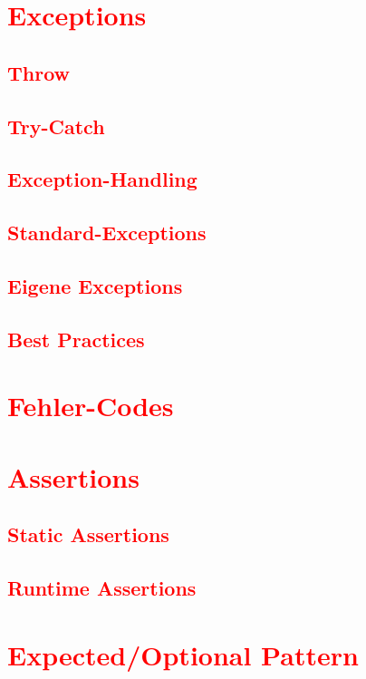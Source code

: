 \section{\textcolor{red}{Exceptions}}\label{sec:exceptions}
\subsection{\textcolor{red}{Throw}}\label{sec:throw}
\subsection{\textcolor{red}{Try-Catch}}\label{sec:catch}
\subsection{\textcolor{red}{Exception-Handling}}\label{sec:exception-handling}
\subsection{\textcolor{red}{Standard-Exceptions}}\label{sec:standard-exceptions}
\subsection{\textcolor{red}{Eigene Exceptions}}\label{sec:custom-exceptions}
\subsection{\textcolor{red}{Best Practices}}\label{sec:best-practices}
\section{\textcolor{red}{Fehler-Codes}}\label{sec:error-codes}
\section{\textcolor{red}{Assertions}}\label{sec:assertions}
\subsection{\textcolor{red}{Static Assertions}}\label{sec:static-assertions}
\subsection{\textcolor{red}{Runtime Assertions}}\label{sec:runtime-assertions}
\section{\textcolor{red}{Expected/Optional Pattern}}\label{sec:expected-optional}
